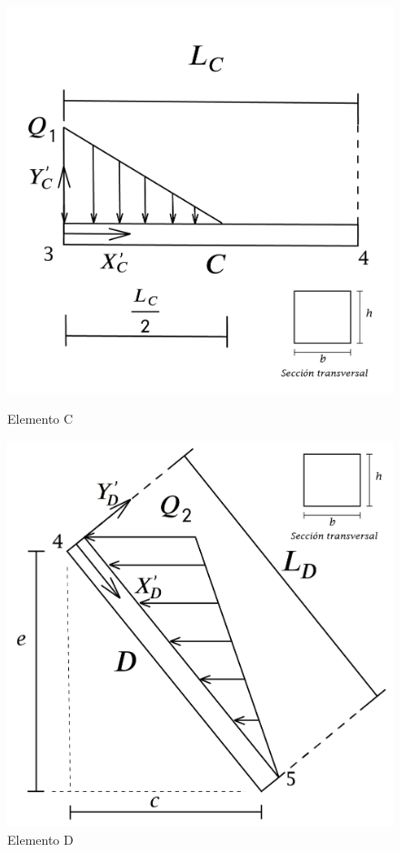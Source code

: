 \documentclass[a4paper]{article}
\begin{document}
\begin{figure}[htp]
  \centering
  \begin{minipage}[b]{0.4\textwidth}
    \includegraphics[width=\textwidth]{Elementos/Elemento_C.png}
    \caption{Elemento C}
  \end{minipage}
  \hfill
  \begin{minipage}[b]{0.4\textwidth}
    \includegraphics[width=\textwidth]{Elementos/Elemento_D.png}
    \caption{Elemento D}
  \end{minipage}
\end{figure}
\end{document}
